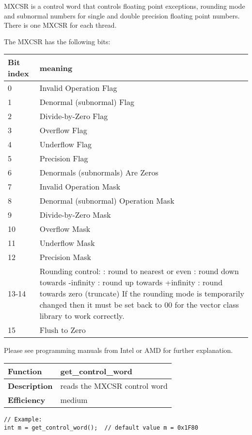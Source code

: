 \documentclass[vcl_manual.tex]{subfiles}
\begin{document}
MXCSR is a control word that controls floating point exceptions, rounding mode and subnormal numbers for single and double precision floating point numbers. There is one MXCSR for each thread. 

The MXCSR has the following bits:
\begin{tabular}{|p{25mm}|p{100mm}|}
\hline
\bfseries Bit index & \bfseries meaning \\ \hline
0 & Invalid Operation Flag \\ \hline
1 & Denormal (subnormal) Flag \\ \hline
2 & Divide-by-Zero Flag \\ \hline
3 & Overflow Flag \\ \hline
4 & Underflow Flag \\ \hline
5 & Precision Flag \\ \hline
6 & Denormals (subnormals) Are Zeros \\ \hline
7 & Invalid Operation Mask \\ \hline
8 & Denormal (subnormal) Operation Mask \\ \hline
9 & Divide-by-Zero Mask \\ \hline
10 & Overflow Mask \\ \hline
11 & Underflow Mask \\ \hline
12 & Precision Mask \\ \hline
13-14 & Rounding control: \newline
00: round to nearest or even \newline
01: round down towards -infinity \newline
10: round up towards +infinity \newline
11: round towards zero (truncate) \newline
If the rounding mode is temporarily changed then it must be set back to 00 for the vector class library to work correctly. \\ \hline
15 & Flush to Zero \\ \hline
\end{tabular}

Please see programming manuals from Intel or AMD for further explanation.


\begin{tabular}{|p{25mm}|p{100mm}|}
\hline
\bfseries Function & get\_control\_word \\ \hline
\bfseries Description & reads the MXCSR control word \\ \hline
\bfseries Efficiency & medium \\ \hline
\end{tabular}
\begin{lstlisting}[frame=none]
// Example:
int m = get_control_word();  // default value m = 0x1F80
\end{lstlisting}
\end{document}
